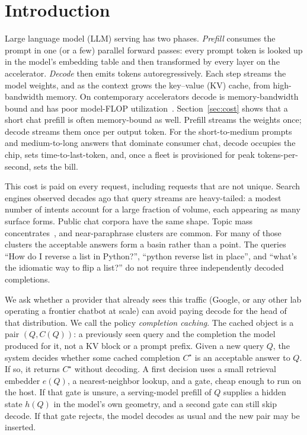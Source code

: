 \section{Introduction}
\label{sec:intro}

Large language model (LLM) serving has two phases. \emph{Prefill} consumes the prompt in one (or a few) parallel forward passes: every prompt token is looked up in the model's embedding table and then transformed by every layer on the accelerator. \emph{Decode} then emits tokens autoregressively. Each step streams the model weights, and as the context grows the key--value (KV) cache, from high-bandwidth memory. On contemporary accelerators decode is memory-bandwidth bound and has poor model-FLOP utilization~\citep{pope2023efficiently,leviathan2023fast}. Section~\ref{sec:cost} shows that a short chat prefill is often memory-bound as well. Prefill streams the weights once; decode streams them once per output token. For the short-to-medium prompts and medium-to-long answers that dominate consumer chat, decode occupies the chip, sets time-to-last-token, and, once a fleet is provisioned for peak tokens-per-second, sets the bill.

This cost is paid on every request, including requests that are not unique. Search engines observed decades ago that query streams are heavy-tailed: a modest number of intents account for a large fraction of volume, each appearing as many surface forms. Public chat corpora have the same shape. Topic mass concentrates~\citep{zheng2024lmsys,zhao2024wildchat}, and near-paraphrase clusters are common. For many of those clusters the acceptable answers form a basin rather than a point. The queries ``How do I reverse a list in Python?'', ``python reverse list in place'', and ``what's the idiomatic way to flip a list?'' do not require three independently decoded completions.

We ask whether a provider that already sees this traffic (Google, or any other lab operating a frontier chatbot at scale) can avoid paying decode for the head of that distribution. We call the policy \emph{completion caching}. The cached object is a pair $(Q, C(Q))$: a previously seen query and the completion the model produced for it, not a KV block or a prompt prefix. Given a new query $Q$, the system decides whether some cached completion $C^\star$ is an acceptable answer to $Q$. If so, it returns $C^\star$ without decoding. A first decision uses a small retrieval embedder $e(Q)$, a nearest-neighbor lookup, and a gate, cheap enough to run on the host. If that gate is unsure, a serving-model prefill of $Q$ supplies a hidden state $h(Q)$ in the model's own geometry, and a second gate can still skip decode. If that gate rejects, the model decodes as usual and the new pair may be inserted.

